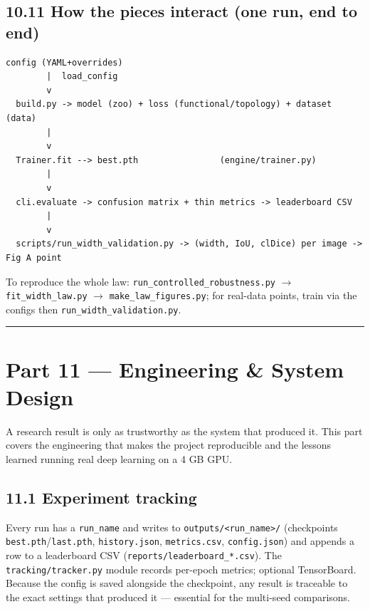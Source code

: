 \documentclass[11pt]{article}
\begin{document}
\subsection*{10.11 How the pieces interact (one run, end to end)}

\begin{Verbatim}[breaklines=true,breakanywhere=true,fontsize=\footnotesize]
  config (YAML+overrides)
        |  load_config
        v
  build.py -> model (zoo) + loss (functional/topology) + dataset (data)
        |
        v
  Trainer.fit --> best.pth                (engine/trainer.py)
        |
        v
  cli.evaluate -> confusion matrix + thin metrics -> leaderboard CSV
        |
        v
  scripts/run_width_validation.py -> (width, IoU, clDice) per image -> Fig A point
\end{Verbatim}

To reproduce the whole law: \texttt{run\_controlled\_robustness.py} $\rightarrow$ \texttt{fit\_width\_law.py} $\rightarrow$ \texttt{make\_law\_figures.py}; for real-data points, train via the configs then \texttt{run\_width\_validation.py}.

\vspace{3pt}\hrule\vspace{3pt}
\clearpage\section*{Part 11 --- Engineering \& System Design}

A research result is only as trustworthy as the system that produced it. This part covers the engineering that makes the project reproducible and the lessons learned running real deep learning on a 4 GB GPU.

\subsection*{11.1 Experiment tracking}

Every run has a \texttt{run\_name} and writes to \texttt{outputs/<run\_name>/} (checkpoints \texttt{best.pth}/\texttt{last.pth}, \texttt{history.json}, \texttt{metrics.csv}, \texttt{config.json}) and appends a row to a leaderboard CSV (\texttt{reports/leaderboard\_*.csv}). The \texttt{tracking/tracker.py} module records per-epoch metrics; optional TensorBoard. Because the config is saved alongside the checkpoint, any result is traceable to the exact settings that produced it --- essential for the multi-seed comparisons.
\end{document}

